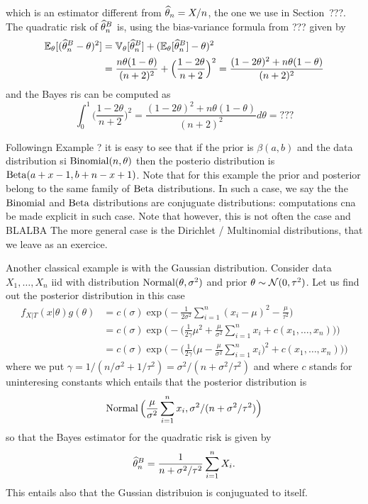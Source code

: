 which is an estimator different from $\widehat \theta_n = X / n$, the one we use in Section~???.
The quadratic risk of $\widehat \theta_n^B$ is, using the bias-variance formula from ??? given by
\begin{align*}
	\mathbb E_\theta[ (\widehat \theta_n^B - \theta)^2] &= \mathbb V_\theta[\widehat \theta_n^B] + (\mathbb E_\theta[\widehat \theta_n^B] - \theta)^2 \\
	&= \frac{n \theta(1 - \theta)}{(n + 2)^2} + \Big( \frac{1 - 2 \theta}{n + 2} \Big)^2 = \frac{(1 - 2 \theta)^2 + n \theta (1 - \theta)}{(n+2)^2}
\end{align*}
and the Bayes ris can be computed as 
\begin{equation*}
	\int_0^1 \Big( \frac{1 - 2 \theta}{n + 2} \Big)^2 = \frac{(1 - 2 \theta)^2 + n \theta (1 - \theta)}{(n+2)^2} d \theta = ???
\end{equation*}


Followingn Example ? it is easy to see that if the prior is $\beta(a, b)$ and the data distribution
 si $\operatorname{Binomial}(n, \theta)$ then the posterio distribution is $\operatorname{Beta}(a + x - 1, b + n - x + 1)$. Note that for this example the prior and posterior belong to the same family of $\operatorname{Beta}$ distributions. In such a case, we say the the $\operatorname{Binomial}$ and $\operatorname{Beta}$ distributions are conjuguate distributions: computations cna be made explicit in such case.
Note that however, this is not often the case and BLALBA
The more general case is the Dirichlet / Multinomial distributions, that we leave as an exercice.

Another classical example is with the Gaussian distribution.
Consider data $X_1, \ldots, X_n$ iid with distribution $\operatorname{Normal}(\theta, \sigma^2)$ and prior $\theta \sim \operatorname{{\mathcal N}}(0, \tau^2)$.
Let us find out the posterior distribution in this case
\begin{align*}
	f_{X | T}(x | \theta) g(\theta) &= c(\sigma) \exp\Big( - \frac{1}{2 \sigma^2} \sum_{i=1}^n (x_i - \mu)^2 - \frac{\mu}{\tau^2} \Big) \\
	&= c(\sigma) \exp \Big (  -\Big( \frac{1}{2 \gamma} \mu^2 + \frac{\mu}{\sigma^2} \sum_{i=1}^n x_i + c(x_1, \ldots, x_n) \Big)  \Big ) \\
	&= c(\sigma) \exp \Big( -\Big( \frac{1}{2 \gamma} \Big( \mu -  \frac{\mu}{\sigma^2} \sum_{i=1}^n x_i 
	\Big)^2 + c(x_1, \ldots, x_n) \Big)  \Big )
\end{align*}
where we put $\gamma = 1 / (n / \sigma^2 + 1 / \tau^2) = \sigma^2 / (n + \sigma^2 / \tau^2)$ and where $c$ stands for uninteresing constants which entails that the posterior distribution is
\begin{equation*}
	\operatorname{Normal}\Big( \frac{\mu}{\sigma^2} \sum_{i=1}^n x_i, \sigma^2 / (n + \sigma^2 / \tau^2) \Big)
\end{equation*}
so that the Bayes estimator for the quadratic risk is given by 
\begin{equation*}
	\widehat \theta_n^B = \frac{1}{n + \sigma^2 / \tau^2} \sum_{i=1}^n X_i.
\end{equation*}
This entails also that the Gussian distribuion is conjuguated to itself.

